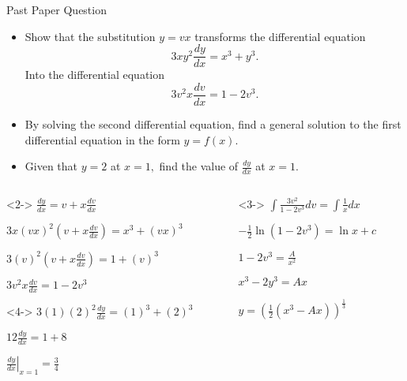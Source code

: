 \documentclass[8pt]{beamer}
\begin{document}
\begin{frame}[shrink]{Past Paper Question}
	\begin{problem}
		\begin{itemize}
			\item Show that the substitution $y=vx$ transforms the differential equation 
				\[
				3xy^2 \frac{dy}{dx}=x^3+y^3
				.\] 
				Into the differential equation
				\[
				3v^2x \frac{dv}{dx}=1-2v^3
				.\] 
			\item By solving the second differential equation, find a general solution to the first differential equation in the form $y=f(x)$.
			\item Given that $y=2$ at $x=1,$ find the value of $\frac{dy}{dx}$ at $x=1$.
			
		\end{itemize}


	\end{problem}
\begin{columns}[T]
\begin{column}{.5\linewidth}
\begin{solution}<2->
	$\frac{dy}{dx}=v+x \frac{dv}{dx}$

	$3x(vx)^2(v+x \frac{dv}{dx})= x^3+(vx)^3$

	$3(v)^2(v+x \frac{dv}{dx})=1+(v)^3$ 

	$3v^2x \frac{dv}{dx}= 1-2v^3$
\end{solution}
\begin{solution}<4->
         $3(1)(2)^2 \frac{dy}{dx}=(1)^3+(2)^3$
  
          $12 \frac{dy}{dx}=1+8$
  
          $\left.\frac{dy}{dx}\right\rvert_{x=1}=\frac{3}{4}$
  \end{solution}

\end{column}
\begin{column}{.5\linewidth}
\begin{solution}<3->
          $\int \frac{3v^2}{1-2v^3} dv = \int \frac{1}{x} dx$ 
  
          $-\frac{1}{2}\ln (1-2v^3)=\ln x +c$
  
          $1-2v^3=\frac{A}{x^2}$
  
          $x^3-2y^3=Ax$
  
         $y=(\frac{1}{2}(x^3-Ax))^{\frac{1}{3}}$
  \end{solution}
\end{column}
\end{columns}
	
\end{frame}
\end{document}
